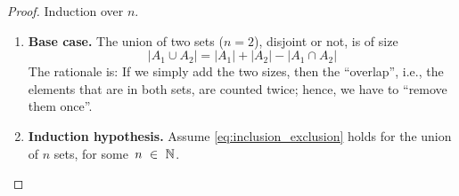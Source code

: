 \begin{proof}\label{proof:inclusion-exclusion}
Induction over \(n\).
\begin{enumerate}[partopsep=0em, topsep=0em, label=(\roman*)]
\item \textbf{Base case.} \label{proof:inclusion-exclusion-BC}
The union of two sets (\(n=2\)), disjoint or not, is of size
$$
\left|A_1 \cup A_2\right|=\left|A_1\right|+\left|A_2\right|-\left|A_1 \cap A_2\right|
$$
The rationale is: 
If we simply add the two sizes, then the ``overlap'', i.e., the elements that are in both sets, are counted twice; 
hence, we have to ``remove them once''. \textcolor{Green}{} 

\item \textbf{Induction hypothesis.} \label{proof:inclusion-exclusion-IH}
Assume \eqref{eq:inclusion_exclusion} holds for the union of \(n\) sets, for some~\(n~\in~\mathbb{N}\).


\end{enumerate}
\end{proof}
